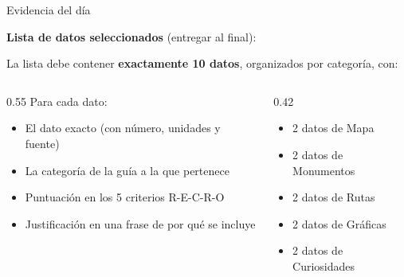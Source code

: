 \documentclass[aspectratio=169, 10pt, spanish]{beamer}
\begin{document}
\begin{frame}{Evidencia del día}
  \begin{evidenciabox}
    \textbf{Lista de datos seleccionados} (entregar al final):

    \vspace{0.3cm}
    La lista debe contener \textbf{exactamente 10 datos}, organizados por categoría, con:

    \begin{columns}[t]
      \begin{column}{0.55\textwidth}
        Para cada dato:
        \begin{itemize}
          \item El dato exacto (con número, unidades y fuente)
          \item La categoría de la guía a la que pertenece
          \item Puntuación en los 5 criterios R-E-C-R-O
          \item Justificación en una frase de por qué se incluye
        \end{itemize}
      \end{column}
      \begin{column}{0.42\textwidth}
        \begin{notabox}
          \begin{itemize}
            \item 2 datos de Mapa
            \item 2 datos de Monumentos
            \item 2 datos de Rutas
            \item 2 datos de Gráficas
            \item 2 datos de Curiosidades
          \end{itemize}
        \end{notabox}
      \end{column}
    \end{columns}
  \end{evidenciabox}
\end{frame}
\end{document}

